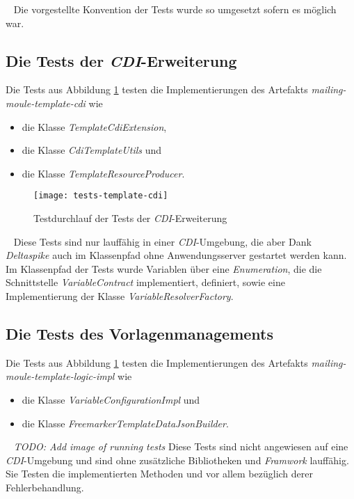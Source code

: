 \ \newline
Die vorgestellte Konvention der Tests wurde so umgesetzt sofern es möglich war. 

\subsection{Die Tests der \emph{CDI}-Erweiterung}
Die Tests aus Abbildung \ref{fig:tests-template-cdi} testen die Implementierungen des Artefakts \emph{mailing-moule-template-cdi} wie
\begin{itemize}
	\item die Klasse \emph{TemplateCdiExtension},
	\item die Klasse \emph{CdiTemplateUtils} und
	\item die Klasse \emph{TemplateResourceProducer}.
\end{itemize}
\begin{figure}[h]
\centering
\texttt{[image: tests-template-cdi]}
\caption{Testdurchlauf der Tests der \emph{CDI}-Erweiterung}
\label{fig:tests-template-cdi}
\end{figure}
\ \newline
Diese Tests sind nur lauffähig in einer \emph{CDI}-Umgebung, die aber Dank \emph{Deltaspike} auch im Klassenpfad ohne Anwendungsserver gestartet werden kann. Im Klassenpfad der Tests wurde Variablen über eine \emph{Enumeration}, die die Schnittstelle \emph{VariableContract} implementiert, definiert, sowie eine Implementierung der Klasse \emph{VariableResolverFactory}.

\subsection{Die Tests des Vorlagenmanagements}
Die Tests aus Abbildung \ref{fig:tests-template-cdi} testen die Implementierungen des Artefakts \emph{mailing-moule-template-logic-impl} wie
\begin{itemize}
	\item die Klasse \emph{VariableConfigurationImpl} und
	\item die Klasse \emph{FreemarkerTemplateDataJsonBuilder}.
\end{itemize}
\ \newline
\emph{TODO: Add image of running tests}
\newline
Diese Tests sind nicht angewiesen auf eine \emph{CDI}-Umgebung und sind ohne zusätzliche Bibliotheken und \emph{Framwork} lauffähig. Sie Testen die implementierten Methoden und vor allem bezüglich derer Fehlerbehandlung.

